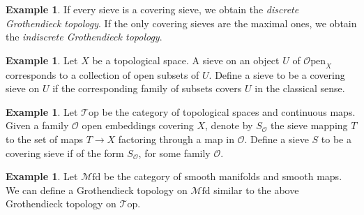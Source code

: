 \documentclass[10pt]{amsart}
\newcommand{\Top}{\mathscr{T}\mathrm{op}}
\newcommand{\Mfd}{\mathscr{M}\mathrm{fd}}
\newcommand{\Open}{\mathscr{O}\mathrm{pen}}
\theoremstyle{definition}
\newtheorem{example}[equation]{Example}
\theoremstyle{remark}
\numberwithin{equation}{section}
\begin{document}
	\begin{example}If every sieve is a covering sieve, we obtain the \emph{discrete Grothendieck topology}. If the only covering sieves are the maximal ones, we obtain the \textit{indiscrete Grothendieck topology}.
	\end{example}
	\begin{example}
		Let $X$ be a topological space. A sieve on an object $U$ of $\Open_X$ corresponds to a collection of open subsets of $U$. Define a sieve to be a covering sieve on $U$ if the corresponding family of subsets covers $U$ in the classical sense.
	\end{example}
	\begin{example}
		Let $\Top$ be the category of topological spaces and continuous maps. Given a family $\mathscr O$ open embeddings covering $X$, denote by $S_\mathscr O$ the sieve mapping $T$ to the set of maps $T\rightarrow X$ factoring through a map in $\mathscr O$. Define a sieve $S$ to be a covering sieve if of the form $S_\mathscr O$, for some family $\mathscr O$. 
	\end{example}
	\begin{example}Let $\Mfd$ be the category of smooth manifolds and smooth maps. We can define a Grothendieck topology on $\Mfd$ similar to the above Grothendieck topology on $\Top$. 
	\end{example}
	
\end{document}
